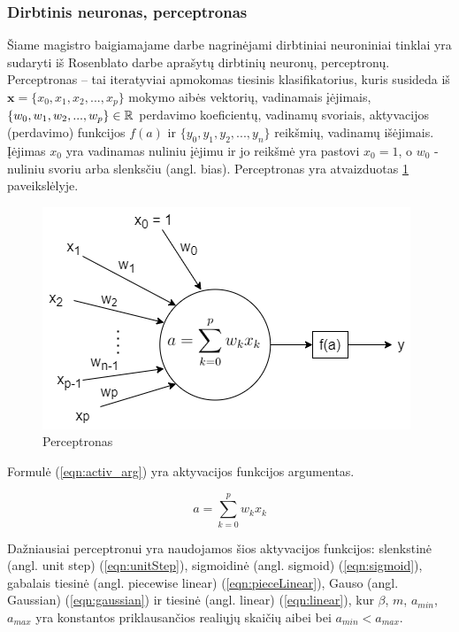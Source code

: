 \subsubsection{Dirbtinis neuronas, perceptronas}

Šiame magistro baigiamajame darbe nagrinėjami dirbtiniai neuroniniai tinklai yra sudaryti iš Rosenblato darbe \cite{rosenPerc} aprašytų dirbtinių neuronų, perceptronų. Perceptronas --  tai iteratyviai apmokomas tiesinis klasifikatorius, kuris susideda iš $\boldsymbol{x} = \{x_{0}, x_{1}, x_{2}, ..., x_{p}\}$ mokymo aibės vektorių, vadinamais įėjimais, $\{w_{0}, w_{1}, w_{2}, ..., w_{p}\} \in \mathbb{R}$ perdavimo koeficientų, vadinamų svoriais, aktyvacijos (perdavimo) funkcijos $f(a)$ ir $\{y_{0}, y_{1}, y_{2}, ..., y_{n}\}$ reikšmių, vadinamų išėjimais. Įėjimas $x_{0}$ yra vadinamas nuliniu įėjimu ir jo reikšmė yra pastovi $x_{0} = 1$, o $w_{0}$ - nuliniu svoriu arba slenksčiu (angl. bias). Perceptronas yra atvaizduotas \ref{img:perceptron} paveikslėlyje.

\begin{figure}[H]
	\centering
	\includegraphics[scale=0.5]{img/perceptron.png}
	\caption{Perceptronas}
	\label{img:perceptron}
\end{figure}

Formulė (\ref{eqn:activ_arg}) yra aktyvacijos funkcijos argumentas.

\begin{equation}
	\label{eqn:activ_arg}
	a = \sum_{k = 0}^{p} w_{k}x_k
\end{equation}

Dažniausiai perceptronui yra naudojamos šios aktyvacijos funkcijos: slenkstinė (angl. unit step) (\ref{eqn:unitStep}), sigmoidinė (angl. sigmoid) (\ref{eqn:sigmoid}), gabalais tiesinė (angl. piecewise linear) (\ref{eqn:pieceLinear}), Gauso (angl. Gaussian) (\ref{eqn:gaussian}) ir tiesinė (angl. linear) (\ref{eqn:linear}), kur $\beta$, $m$, $a_{min}$, $a_{max}$ yra konstantos priklausančios realiųjų skaičių aibei bei $a_{min} < a_{max}$.

